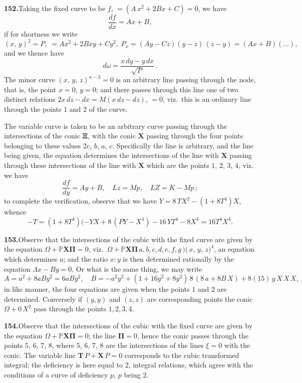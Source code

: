 \documentclass[11pt,a4paper]{article}
\begin{document}
\medskip\noindent\textbf{152.}\quad Taking the fixed curve to be $f$, $= (A\,x^2 + 2Bx + C) = 0$, we have
\[
\frac{df}{dx} = Ax + B,
\]
if for shortness we write
\[
(x,\,y)^2 = P,\;= Ax^2 + 2Bxy + Cy^2,\;P_x = (Ay - Cz)(y - z)\,(z - y) = (Ax + B)(\ldots),
\]
and we thence have
\[
d\omega = \frac{x\,dy - y\,dx}{\sqrt{P}}\,.
\]
The minor curve $(x,\,y,\,z)^{n-3} = 0$ is an arbitrary line passing through the node, that is, the point $x = 0$, $y = 0$; and there passes through this line one of two distinct relations $2x\,dz - dx = M(x\,dz - dz)$, $= 0$, viz.\ this is an ordinary line through the points 1 and 2 of the curve.

The variable curve is taken to be an arbitrary curve passing through the intersections of the conic $\bm{\Xi}$, with the conic $\bm{X}$ passing through the four points belonging to these values $2c$, $b$, $a$, $c$. Specifically the line is arbitrary, and the line being given, the equation determines the intersections of the line with $\bm{X}$ passing through these intersections of the line with $\bm{X}$ which are the points $1$, $2$, $3$, $4$, viz. we have
\[
\frac{df}{dy} = Ay + B,\quad Lz = Mp,\quad LZ = K - Mp\,;
\]
to complete the verification, observe that we have $Y = 8\,T X^2 - (1 + 8T^4)X$, whence
\[
- T = (1 + 8T^4)(-Y X + 8\,(PY - X^4) - 16\,Y T^4 - 8X^4 = 16T^4 X^4.
\]

\medskip\noindent\textbf{153.}\quad Observe that the intersections of the cubic with the fixed curve are given by the equation $\Omega + \mathbb{P}\bm{X}\bm{\Pi} = 0$, viz.\ $\Omega + \mathbb{P}\bm{X}\bm{\Pi}\,a, b, c, d, e, f, g\!\,\mbox{$)\!($}\,x,\,y,\,z)^4$, an equation which determines $a$; and the ratio $x : y$ is then determined rationally by the equation $\Lambda x - By = 0$. Or what is the same thing, we may write
\[
A = a^2 + 8aB y^2 = 6aB y^2,\quad B = -a^2 y^2 + (1 + 16y^2 + 8y^2)\,8\,(8\,a + 8B \,X) + 8(15)\,y\,X\,X\,X,
\]
in like manner, the four equations are given when the points $1$ and $2$ are determined. Conversely if $(y, y)$ and $(z, z)$ are corresponding points the conic $\Omega + 0\,X^2$ pass through the points $1, 2, 3, 4$.

\medskip\noindent\textbf{154.}\quad Observe that the intersections of the cubic with the fixed curve are given by the equation $\Omega + \mathbb{P}\bm{X}\bm{\Pi} = 0$; the line $\bm{\Pi} = 0$, hence the conic passes through the points $5$, $6$, $7$, $8$, where $5$, $6$, $7$, $8$ are the intersections of the lines $\xi = 0$ with the conic. The variable line $\bm{T}\,P + \bm{X}\,P = 0$ corresponds to the cubic transformed integral; the deficiency is here equal to $2$, integral relations, which agree with the conditions of a curve of deficiency $p$, $p$ being $2$.
\end{document}
